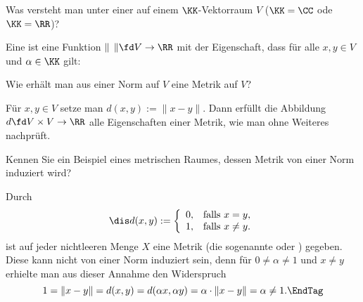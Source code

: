 \begin{frage}
  Was versteht man unter einer  
  auf einem $\KK$-Vektorraum $V$ ($\KK=\CC$ ode $\KK=\RR$)?
\end{frage}

\begin{antwort}
  Eine  ist eine Funktion $\|\;\, \| \fd V\to \RR$ mit der 
  Eigenschaft, dass für alle $x,y\in V$ und $\alpha \in \KK$ gilt:
  {\setlength{\labelsep}{7mm}
    }
\end{antwort}

\begin{frage}
  Wie erhält man aus einer Norm auf $V$ eine Metrik auf $V$?
\end{frage}

\begin{antwort}
  Für $x,y\in V$ setze man $d(x,y) := \| x-y \|$. Dann erfüllt  
  die Abbildung $d \fd V\times V \to \RR$ 
  alle Eigenschaften einer Metrik, 
  wie man ohne Weiteres nachprüft. \AntEnd
\end{antwort}

\begin{frage}\label{08_diskr}
  Kennen Sie ein Beispiel eines metrischen Raumes, dessen Metrik 
   von einer Norm induziert wird?
\end{frage}

\begin{antwort}
  Durch
  \[
  \dis d(x,y) := \left\{ \begin{array}{ll} 0, & \text{falls $x=y$,} \\
      1, & \text{falls $x\not=y$.} \end{array} \right.
  \]
  ist auf jeder nichtleeren Menge $X$ eine Metrik (die sogenannte 
   oder ) gegeben. Diese kann
  nicht von einer Norm induziert sein, denn für 
  $0\not=\alpha\not=1$ und $x\not=y$ erhielte man aus 
  dieser Annahme den Widerspruch    
  \begin{equation}
    1 = \| x-y \| = d(x,y) = d( \alpha x, \alpha y) 
    = \alpha \cdot \| x-y \| = \alpha \not=1.
    \EndTag
  \end{equation} 
\end{antwort}

